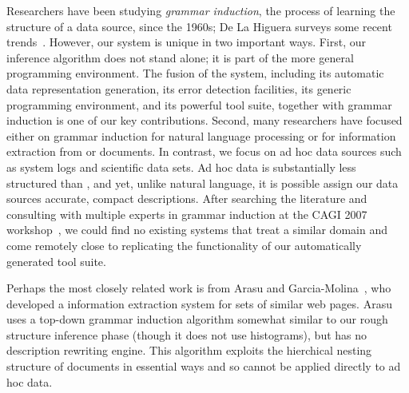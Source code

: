 Researchers have been studying {\em grammar induction}, the process of
learning the structure of a data source, since the 1960s; De La Higuera
surveys some recent trends~\cite{higuera01current}.  However,
our system is unique in two important ways.  First, our inference
algorithm does not stand alone; it is part of the more general \pads{}
programming environment.  The fusion of the
\pads{} system, including its automatic data representation generation,
its error detection facilities, its generic programming environment, 
and its powerful tool suite, together with grammar induction
is one of our key contributions.  Second, many researchers have
focused either on grammar induction for natural language processing or
for information extraction from \xml{} or \html{} documents.  In
contrast, we focus on ad hoc data sources such as system logs and
scientific data sets. Ad hoc data is substantially less
structured than \xml{}, and yet, unlike natural language, it is
possible assign our data sources accurate, compact descriptions.  After 
searching the literature and consulting
with multiple experts in grammar induction at the CAGI 2007 
workshop~\cite{cagi07}, we could find no existing 
systems that treat a similar domain and come remotely close to
replicating the functionality of our automatically generated tool suite.


Perhaps the most closely related work is from Arasu and 
Garcia-Molina~\cite{arasu+:sigmod03}, who developed a information
extraction system for sets of similar web pages.  
Arasu uses a top-down grammar induction
algorithm somewhat similar to our rough structure inference phase
(though it does not use histograms),
but has no description rewriting engine.  
This algorithm exploits the hierchical nesting
structure of \xml{} documents in essential ways
and so cannot be applied directly to ad hoc data.  

